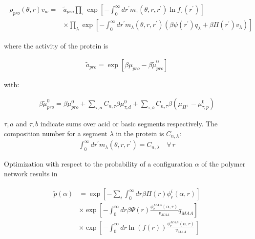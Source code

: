 \documentclass[journal=jacsat,manuscript=suppinfo]{achemso}
\begin{document}
	
	
	\begin{align}
		\begin{aligned}
			\rho_{pro}(\theta, r)v_w = & \tilde{a}_{pro} \prod_\tau \exp\left[ -\int_0^\infty dr^\prime  m_\tau(\theta,r,r^\prime) \ln f_\tau(r^\prime)\right] \\
			& \times \prod_\lambda \exp\left[ -\int_0^\infty dr^\prime  m_\lambda(\theta,r,r^\prime)\left( \beta\psi(r^\prime) q_\lambda + \beta \Pi(r^\prime) v_\lambda \right)\right]
		\end{aligned}
		\label{eq:si:rho-pro}
	\end{align}
	
	\noindent where the activity of the protein is
	
	\begin{align}
		\tilde{a}_{pro} = \exp[\beta\mu_{pro} - \beta\tilde{\mu}^0_{pro}]
	\end{align}
	
	with:
	
	\begin{align}
		\beta\tilde{\mu}^0_{pro} =  \beta \mu^0_{pro}  + \sum_{\tau,a} C_{n,\tau}\beta\mu^0_{\tau,d} 
		+ \sum_{\tau,b} C_{n,\tau}\beta(\mu_{H^+} - \mu^0_{\tau,p})
	\end{align}
	
	
	\noindent $\tau,a$ and $\tau,b$ indicate sums over acid or basic segments respectively.
	The composition number for a segment $\lambda$ in the protein is $C_{n,\lambda}$:
	\begin{align}
		\int_0^\infty dr^\prime  m_\lambda(\theta,r,r^\prime) = C_{n,\lambda}\quad \forall \, r
		\label{si:eq:composition}
	\end{align}
	
	
	Optimization with respect to the probability of a configuration $\alpha$ of the polymer network  results in
	
	\begin{align}
		\begin{aligned}
			\tilde{p}(\alpha)&=\exp\left[- \sum_i{\int_0^\infty{dr\beta\Pi(r)\phi^i_r(\alpha,r)}}\right] \\
			& \times \exp \left[ -\int_0^\infty dr \beta \Psi(r)\frac{\phi^{MAA}_r(\alpha,r)}{v_{MAA}} q_{MAA}  \right] \\
			& \times \exp\left[ -\int_0^\infty{ dr\ln(f(r))\frac{\phi^{MAA}_r(\alpha,r)}{v_{MAA}}}\right] \\
		\end{aligned}
		\label{eq:si:proba-alfa}
	\end{align}
	
\end{document}
